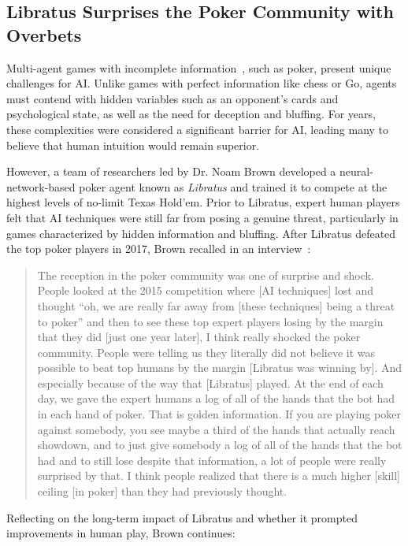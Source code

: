 \subsection{Libratus Surprises the Poker Community with Overbets~\citep{BrownLibratus2017, KanjunAndNoam}}
\label{sec:libratus}

Multi-agent games with incomplete information~\citep{leytonbrown2008gametheory}, such as poker, present unique challenges for AI. Unlike games with perfect information like chess or Go, agents must contend with hidden variables such as an opponent's cards and psychological state, as well as the need for deception and bluffing. For years, these complexities were considered a significant barrier for AI, leading many to believe that human intuition would remain superior.

However, a team of researchers led by Dr. Noam Brown developed a neural-network-based poker agent known as \emph{Libratus} and trained it to compete at the highest levels of no-limit Texas Hold'em. Prior to Libratus, expert human players felt that AI techniques were still far from posing a genuine threat, particularly in games characterized by hidden information and bluffing. After Libratus defeated the top poker players in 2017, Brown recalled in an interview~\citep{KanjunAndNoam}:

\begin{quote}
The reception in the poker community was one of surprise and shock. People looked at the 2015 competition where [AI techniques] lost and thought ``oh, we are really far away from [these techniques] being a threat to poker'' and then to see these top expert players losing by the margin that they did [just one year later], I think really shocked the poker community. People were telling us they literally did not believe it was possible to beat top humans by the margin [Libratus was winning by]. And especially because of the way that [Libratus] played. At the end of each day, we gave the expert humans a log of all of the hands that the bot had in each hand of poker. That is golden information. If you are playing poker against somebody, you see maybe a third of the hands that actually reach showdown, and to just give somebody a log of all of the hands that the bot had and to still lose despite that information, a lot of people were really surprised by that.
I think people realized that there is a much higher [skill] ceiling [in poker] than they had previously thought.
\end{quote}

Reflecting on the long-term impact of Libratus and whether it prompted improvements in human play, Brown continues:

